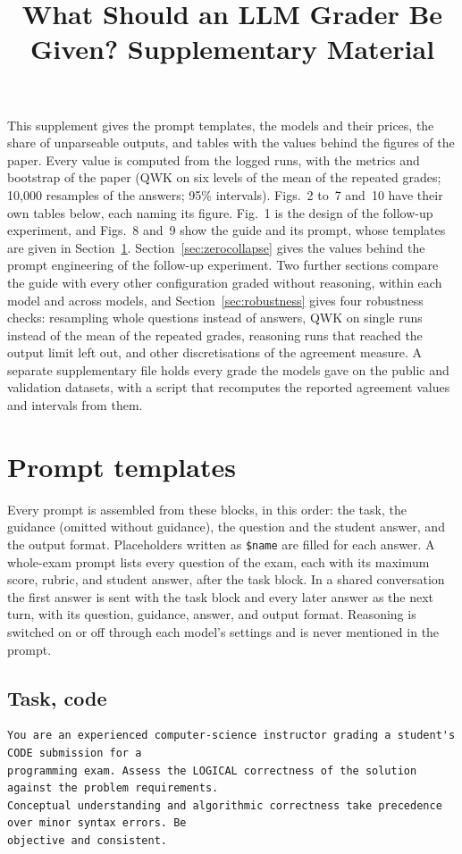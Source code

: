 \documentclass[10pt]{article}
\title{What Should an LLM Grader Be Given? Supplementary Material}
\date{}
\begin{document}
\maketitle

This supplement gives the prompt templates, the models and their prices, the share of unparseable outputs, and tables with the values behind the figures of the paper. Every value is computed from the logged runs, with the metrics and bootstrap of the paper (QWK on six levels of the mean of the repeated grades; 10,000 resamples of the answers; 95\% intervals). Figs.~2 to~7 and~10 have their own tables below, each naming its figure. Fig.~1 is the design of the follow-up experiment, and Figs.~8 and~9 show the guide and its prompt, whose templates are given in Section~\ref{sec:prompts}. Section~\ref{sec:zerocollapse} gives the values behind the prompt engineering of the follow-up experiment. Two further sections compare the guide with every other configuration graded without reasoning, within each model and across models, and Section~\ref{sec:robustness} gives four robustness checks: resampling whole questions instead of answers, QWK on single runs instead of the mean of the repeated grades, reasoning runs that reached the output limit left out, and other discretisations of the agreement measure. A separate supplementary file holds every grade the models gave on the public and validation datasets, with a script that recomputes the reported agreement values and intervals from them.

\section{Prompt templates}\label{sec:prompts}
Every prompt is assembled from these blocks, in this order: the task, the guidance (omitted without guidance), the question and the student answer, and the output format. Placeholders written as \texttt{\$name} are filled for each answer. A whole-exam prompt lists every question of the exam, each with its maximum score, rubric, and student answer, after the task block. In a shared conversation the first answer is sent with the task block and every later answer as the next turn, with its question, guidance, answer, and output format. Reasoning is switched on or off through each model's settings and is never mentioned in the prompt.
\subsection*{Task, code}
\begin{Verbatim}[fontsize=\footnotesize]
You are an experienced computer-science instructor grading a student's CODE submission for a
programming exam. Assess the LOGICAL correctness of the solution against the problem requirements.
Conceptual understanding and algorithmic correctness take precedence over minor syntax errors. Be
objective and consistent.
\end{Verbatim}
\end{document}
